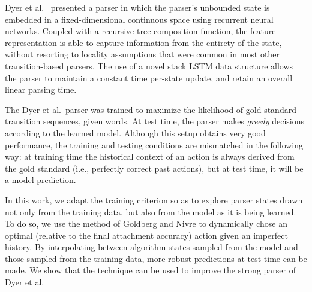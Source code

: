 \documentclass[11pt]{article}
\newcommand{\ignore}[1]{}
\begin{document}
Dyer et al.~ presented a parser in which the
parser's unbounded state is embedded in a fixed-dimensional continuous space using recurrent neural networks. Coupled with a recursive
tree composition function, the feature representation is able to capture
information from the entirety of the state, without resorting to locality
assumptions that were common in most other transition-based parsers.
The use of a novel stack LSTM
data structure allows the parser to maintain a constant time per-state update,
and retain an overall linear parsing time. 

The Dyer et al.~parser was trained to maximize the likelihood of
gold-standard transition sequences, given words. At test time, the
parser makes \emph{greedy} decisions according to the learned
model. Although this setup obtains very good performance, the training
and testing conditions are mismatched in the following way: at
training time the historical context of an action is always derived
from the gold standard (i.e., perfectly correct past actions), but at test time, it will be a model prediction.

In this work, we adapt the training criterion so as to explore parser states drawn not only from the training data, but also from the model as it is being learned.
To do so, we use the method of Goldberg and Nivre  to dynamically chose an optimal (relative to the final attachment accuracy) action given an imperfect history. By interpolating between algorithm states sampled from the model and those sampled from the training data, more robust predictions at test time can be made. We show that
the technique can be used to improve the strong parser of Dyer
et al.

\ignore{
\paragraph{Notation} We follow the convention that vectors are written with lowercase, boldface letters (e.g., $\mathbf{v}$ or $\mathbf{v}_w$); matrices are written with uppercase, boldface letters (e.g., $\mathbf{M}$, $\mathbf{M}_{a}$, or $\mathbf{M}_{ab}$), and scalars are written as lowercase letters (e.g., $s$ or $q_z$). Structured objects such as sequences of discrete symbols are written with lowercase, bold, italic letters (e.g., $\boldsymbol{w}$ refers to a sequence of input words). 
We use a semicolon to denote vector concatenation (e.g., $[\mathbf{a};\mathbf{b}]$).
}
\end{document}
